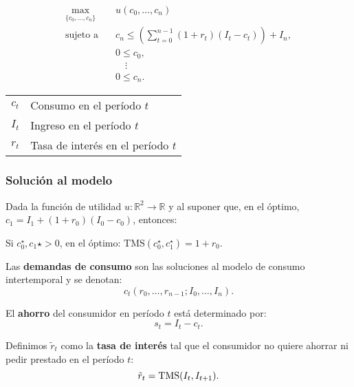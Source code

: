 \documentclass[8pt,a4paper]{extarticle}
\begin{document}
\begin{multicols}{3}
\begin{equation*}
\begin{aligned}
	\max_{\{c_0, \ldots, c_n\}}\	  & u(c_0, \ldots, c_n) \\
	\text{sujeto a} \quad & c_n \le \left(\sum_{t=0}^{n-1} (1 + r_t)(I_t - c_t) \right) + I_n, \\
						  & 0 \le c_0, \\
						  & \quad \vdots \\
						  & 0 \le c_n.
\end{aligned}
\end{equation*}

\begin{center}
\begin{tabular}{ c l }
	\hline
	$c_t$ & Consumo en el período $t$ \\
	$I_t$ & Ingreso en el período $t$ \\
	$r_t$ & Tasa de interés en el período $t$ \\
	\hline
\end{tabular}
\end{center}

\subsubsection*{Solución al modelo}

Dada la función de utilidad $u : \mathbb{R}^2 \to \mathbb{R}$ y al suponer que, en el óptimo, $c_1 = I_1 + (1 + r_0) (I_0 - c_0)$, entonces:

\begin{bulletlist}
\item Si $c_0^\star, c_1\star > 0$, en el óptimo: $\text{TMS} (c_0^\star, c_1^\star) = 1 + r_0$.
\end{bulletlist}

\begin{boxdef}
	Las \textbf{demandas de consumo} son las soluciones al modelo de consumo intertemporal y se denotan:
	\[
		c_t(r_0, \ldots, r_{n-1}; I_0, \ldots, I_n)
	.\] 
\end{boxdef}

\begin{boxdef}[Ahorro]
	El \textbf{ahorro} del consumidor en período $t$ está determinado por:
	\[
		s_t = I_t - c_t
	.\] 
\end{boxdef}

\begin{boxdef}
	Definimos $\tilde{r}_t$ como la \textbf{tasa de interés} tal que el consumidor no quiere ahorrar ni pedir prestado en el período $t$:
	\[
		\tilde{r}_t = \text{\normalfont TMS} (I_t, I_{t+1})
	.\] 
\end{boxdef}


\end{multicols}
\end{document}
